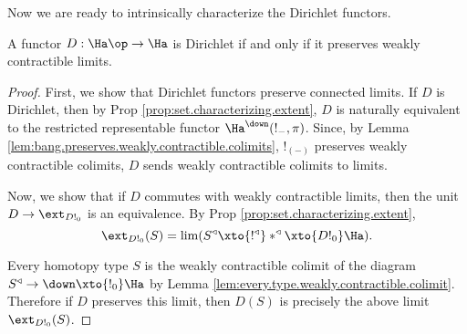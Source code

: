 Now we are ready to intrinsically characterize the Dirichlet functors.
\begin{thm}
A functor $D : \Ha\op \to \Ha$ is Dirichlet if and only if it preserves
weakly contractible limits. 
\end{thm}
\begin{proof}
First, we show that Dirichlet functors preserve connected limits. If $D$ is
Dirichlet, then by Prop \ref{prop:set.characterizing.extent}, $D$ is naturally
equivalent to the restricted representable functor $\Ha^{\down}(!_{-}, \pi)$.
Since, by Lemma \ref{lem:bang.preserves.weakly.contractible.colimits}, $!_{(-)}$
preserves weakly contractible colimits, $D$ sends weakly contractible colimits
to limits.

Now, we show that if $D$ commutes with weakly contractible limits, then the unit
$D \to \ext_{D!_0}$ is an equivalence. By Prop
\ref{prop:set.characterizing.extent}, 
  $$\ext_{D!_0}(S) = \lim(S^{\triangleleft} \xto{!^{\triangleleft}} \ast^{\triangleleft}
  \xto{D!_0} \Ha).$$
  
Every homotopy type $S$ is the weakly contractible colimit of the diagram $S^{\triangleleft} \to
\down \xto{!_0} \Ha$ by Lemma \ref{lem:every.type.weakly.contractible.colimit}. Therefore if $D$ preserves this limit, then
$D(S)$ is precisely the above limit $\ext_{D!_0}(S)$.
\end{proof}

